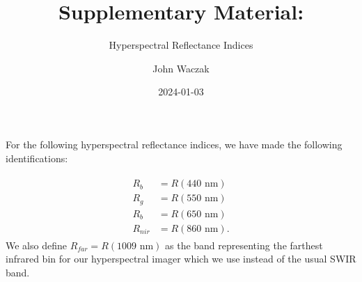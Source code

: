 \documentclass[
  letterpaper,
  DIV=11,
  numbers=noendperiod]{scrartcl}
\title{Supplementary Material:}
\subtitle{Hyperspectral Reflectance Indices}
\author{John Waczak}
\date{2024-01-03}
\begin{document}
\maketitle
\ifdefined\Shaded\renewenvironment{Shaded}{\begin{tcolorbox}[boxrule=0pt, sharp corners, breakable, interior hidden, borderline west={3pt}{0pt}{shadecolor}, enhanced, frame hidden]}{\end{tcolorbox}}\fi

For the following hyperspectral reflectance indices, we have made the
following identifications:

\begin{align}\label{eq:ref-bands}
\begin{split}
    R_b &= R(440 \text{ nm}) \\
    R_g &= R(550 \text{ nm}) \\
    R_b &= R(650 \text{ nm}) \\
    R_{nir} &= R(860 \text{ nm}).
\end{split}
\end{align} We also define \(R_{far} = R(1009 \text{ nm})\) as the band
representing the farthest infrared bin for our hyperspectral imager
which we use instead of the usual SWIR band.
\end{document}
